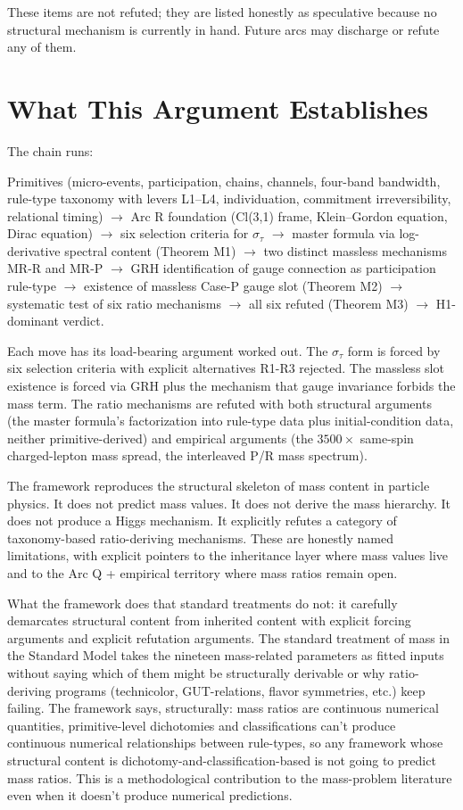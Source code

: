 \documentclass[11pt,a4paper]{article}
\begin{document}
These items are not refuted; they are listed honestly as speculative because no structural mechanism is currently in hand. Future arcs may discharge or refute any of them.

\section{What This Argument Establishes}

The chain runs:

Primitives (micro-events, participation, chains, channels, four-band bandwidth, rule-type taxonomy with levers L1--L4, individuation, commitment irreversibility, relational timing) $\to$ Arc R foundation (Cl(3,1) frame, Klein--Gordon equation, Dirac equation) $\to$ six selection criteria for $\sigma_\tau$ $\to$ master formula via log-derivative spectral content (Theorem M1) $\to$ two distinct massless mechanisms MR-R and MR-P $\to$ GRH identification of gauge connection as participation rule-type $\to$ existence of massless Case-P gauge slot (Theorem M2) $\to$ systematic test of six ratio mechanisms $\to$ all six refuted (Theorem M3) $\to$ H1-dominant verdict.

Each move has its load-bearing argument worked out. The $\sigma_\tau$ form is forced by six selection criteria with explicit alternatives R1-R3 rejected. The massless slot existence is forced via GRH plus the mechanism that gauge invariance forbids the mass term. The ratio mechanisms are refuted with both structural arguments (the master formula's factorization into rule-type data plus initial-condition data, neither primitive-derived) and empirical arguments (the $3500\times$ same-spin charged-lepton mass spread, the interleaved P/R mass spectrum).

The framework reproduces the structural skeleton of mass content in particle physics. It does not predict mass values. It does not derive the mass hierarchy. It does not produce a Higgs mechanism. It explicitly refutes a category of taxonomy-based ratio-deriving mechanisms. These are honestly named limitations, with explicit pointers to the inheritance layer where mass values live and to the Arc Q + empirical territory where mass ratios remain open.

What the framework does that standard treatments do not: it carefully demarcates structural content from inherited content with explicit forcing arguments and explicit refutation arguments. The standard treatment of mass in the Standard Model takes the nineteen mass-related parameters as fitted inputs without saying which of them might be structurally derivable or why ratio-deriving programs (technicolor, GUT-relations, flavor symmetries, etc.) keep failing. The framework says, structurally: mass ratios are continuous numerical quantities, primitive-level dichotomies and classifications can't produce continuous numerical relationships between rule-types, so any framework whose structural content is dichotomy-and-classification-based is not going to predict mass ratios. This is a methodological contribution to the mass-problem literature even when it doesn't produce numerical predictions.
\end{document}
